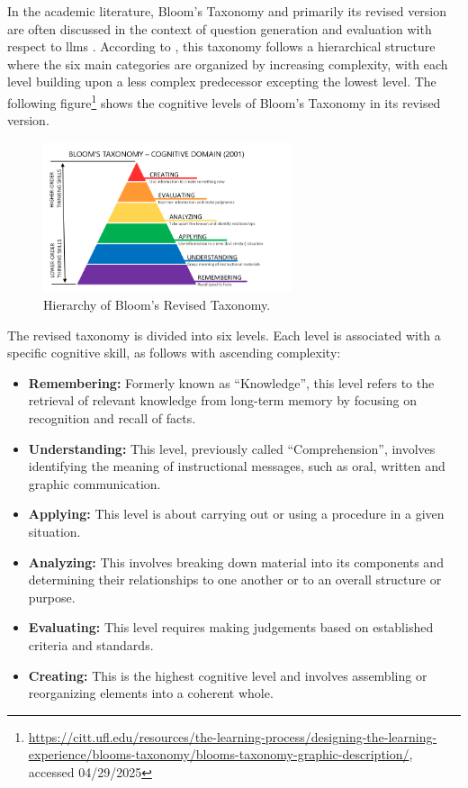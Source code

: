  In the academic literature, Bloom's Taxonomy \cite{krathwohl_taxonomy_1964} and primarily its revised version \cite{krathwohl_revision_2002} are often discussed in the context of question generation and evaluation with respect to \ac{llms} \cite{zhuge_twinstar_2025,scaria_automated_2024,scaria_how_2024,elkins_how_2023}.
According to \cite{krathwohl_revision_2002}, this taxonomy follows a hierarchical structure where the six main categories are organized by increasing complexity, with each level building upon a less complex predecessor excepting the lowest level. The following figure\footnote{\url{https://citt.ufl.edu/resources/the-learning-process/designing-the-learning-experience/blooms-taxonomy/blooms-taxonomy-graphic-description/}, accessed 04/29/2025} shows the cognitive levels of Bloom's Taxonomy in its revised version.

\begin{figure}[htbp]
   \vspace{-.5em}
   \centering
   \includegraphics[width=0.65\textwidth]{../extra/Blooms-Taxonomy.png}
   \caption{Hierarchy of Bloom's Revised Taxonomy.}
\end{figure}

The revised taxonomy \cite{krathwohl_revision_2002} is divided into six levels. Each level is associated with a specific cognitive skill, as follows with ascending complexity:

\begin{itemize}
   \item \textbf{Remembering:} Formerly known as \enquote{Knowledge}, this level refers to the retrieval of relevant knowledge from long-term memory by focusing on recognition and recall of facts.
   \item \textbf{Understanding:} This level, previously called \enquote{Comprehension}, involves identifying the meaning of instructional messages, such as oral, written and graphic communication.
   \item \textbf{Applying:} This level is about carrying out or using a procedure in a given situation.
   \item \textbf{Analyzing:} This involves breaking down material into its components and determining their relationships to one another or to an overall structure or purpose.
   \item \textbf{Evaluating:} This level requires making judgements based on established criteria and standards.
   \item \textbf{Creating:} This is the highest cognitive level and involves assembling or reorganizing elements into a coherent whole.
\end{itemize}

